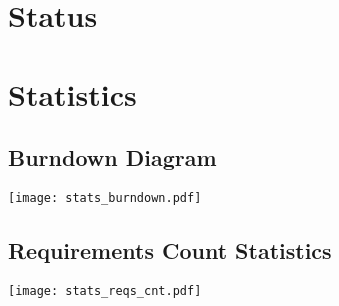 \documentclass{report}
\begin{document}
\tableofcontents

\newpage



\chapter{Status}


\chapter{Statistics}
\section{Burndown Diagram}
\texttt{[image: stats\_burndown.pdf]}

\section{Requirements Count Statistics}
\texttt{[image: stats\_reqs\_cnt.pdf]}


\end{document}
